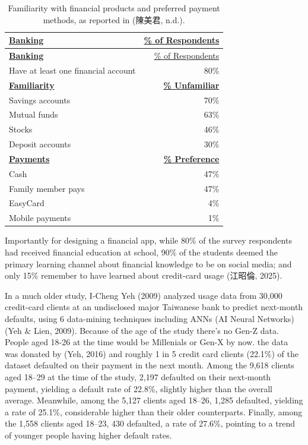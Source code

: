 \documentclass[
  12pt,
  letterpaper,
  DIV=11,
  numbers=noendperiod]{scrartcl}
\begin{document}
\begin{longtable}[]{@{}lr@{}}
\caption[Taiwanese Financial Product Familiarity]{Familiarity with
financial products and preferred payment methods, as reported in
(陳美君, n.d.).}\tabularnewline
\toprule\noalign{}
\ul{\textbf{Banking}} & \ul{\% of Respondents} \\
\midrule\noalign{}
\endfirsthead
\toprule\noalign{}
\ul{\textbf{Banking}} & \ul{\% of Respondents} \\
\midrule\noalign{}
\endhead
\bottomrule\noalign{}
\endlastfoot
Have at least one financial account & 80\% \\
\ul{\textbf{Familiarity}} & \ul{\textbf{\% Unfamiliar}} \\
Savings accounts & 70\% \\
Mutual funds & 63\% \\
Stocks & 46\% \\
Deposit accounts & 30\% \\
\ul{\textbf{Payments}} & \ul{\textbf{\% Preference}} \\
Cash & 47\% \\
Family member pays & 47\% \\
EasyCard & 4\% \\
Mobile payments & 1\% \\
\end{longtable}

\let\pandoctableshortcapt\relax

Importantly for designing a financial app, while 80\% of the survey
respondents had received financial education at school, 90\% of the
students deemed the primary learning channel about financial knowledge
to be on social media; and only 15\% remember to have learned about
credit-card usage (江昭倫, 2025).

In a much older study, I-Cheng Yeh (2009) analyzed usage data from
30,000 credit-card clients at an undisclosed major Taiwanese bank to
predict next-month defaults, using 6 data-mining techniques including
ANNs (AI Neural Networks) (Yeh \& Lien, 2009). Because of the age of the
study there's no Gen-Z data. People aged 18-26 at the time would be
Millenials or Gen-X by now. the data was donated by (Yeh, 2016) and
roughly 1 in 5 credit card clients (22.1\%) of the dataset defaulted on
their payment in the next month. Among the 9,618 clients aged 18--29 at
the time of the study, 2,197 defaulted on their next‐month payment,
yielding a default rate of 22.8\%, slightly higher than the overall
average. Meanwhile, among the 5,127 clients aged 18--26, 1,285
defaulted, yielding a rate of 25.1\%, considerable higher than their
older counterparts. Finally, among the 1,558 clients aged 18--23, 430
defaulted, a rate of 27.6\%, pointing to a trend of younger people
having higher default rates.
\end{document}
